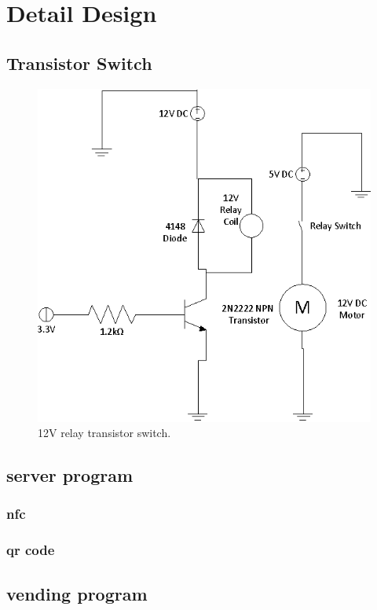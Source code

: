 \chapter{Detail Design}

\section{Transistor Switch}

\begin{figure}[h]
\centering
\includegraphics[scale=0.7]{relay_switch.eps}
\caption{12V relay transistor switch. }
\end{figure}

\section{server program}
\subsection{nfc}
\subsection{qr code}

\section{vending program}
